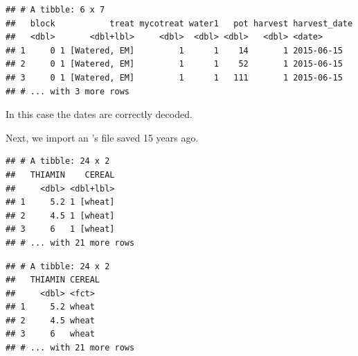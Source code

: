 \documentclass[krantz2]{krantz}\usepackage{knitr}
\begin{document}
\begin{knitrout}\footnotesize
{}\color{fgcolor}\begin{kframe}
\begin{alltt}
 \hlkwb{<-} \hlstd{(} \hlstd{=} \hlstd{)}
\hlstd{my_spss.tb[}\hlopt{:}\hlstd{,} \hlstd{(}\hlopt{:}\hlstd{,} \hlstd{)]}
\end{alltt}
\begin{verbatim}
## # A tibble: 6 x 7
##   block           treat mycotreat water1   pot harvest harvest_date
##   <dbl>       <dbl+lbl>     <dbl>  <dbl> <dbl>   <dbl> <date>      
## 1     0 1 [Watered, EM]         1      1    14       1 2015-06-15  
## 2     0 1 [Watered, EM]         1      1    52       1 2015-06-15  
## 3     0 1 [Watered, EM]         1      1   111       1 2015-06-15  
## # ... with 3 more rows
\end{verbatim}
\end{kframe}
\end{knitrout}

In this case the dates are correctly decoded.

Next, we import an 's  file saved 15 years ago.

\begin{knitrout}\footnotesize
{}\color{fgcolor}\begin{kframe}
\begin{alltt}
 \hlkwb{<-} \hlstd{(} \hlstd{=} \hlstd{)}
\end{alltt}
\begin{verbatim}
## # A tibble: 24 x 2
##   THIAMIN    CEREAL
##     <dbl> <dbl+lbl>
## 1     5.2 1 [wheat]
## 2     4.5 1 [wheat]
## 3     6   1 [wheat]
## # ... with 21 more rows
\end{verbatim}
\begin{alltt}
 \hlkwb{<-} 
\end{alltt}
\begin{verbatim}
## # A tibble: 24 x 2
##   THIAMIN CEREAL
##     <dbl> <fct> 
## 1     5.2 wheat 
## 2     4.5 wheat 
## 3     6   wheat 
## # ... with 21 more rows
\end{verbatim}
\end{kframe}
\end{knitrout}
\end{document}
